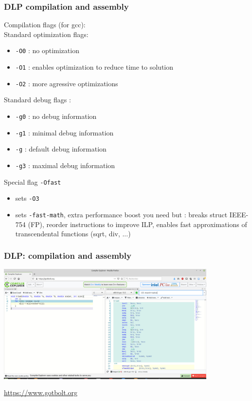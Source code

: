 \begin{frame}[containsverbatim]
\frametitle{DLP compilation and assembly}
{\footnotesize
Compilation flags (for gcc):
\\
Standard optimization flags:
\begin{itemize}
\item \texttt{-O0} : no optimization
\item \texttt{-O1} : enables optimization to reduce time to solution
\item \texttt{-O2} : more agressive optimizations
\end{itemize}
Standard debug flags :
\begin{itemize}
\item \texttt{-g0} : no debug information
\item \texttt{-g1} : minimal debug information
\item \texttt{-g} : default debug information
\item \texttt{-g3} : maximal debug information
\end{itemize}
Special flag \texttt{-Ofast}
\begin{itemize}
\item sets \texttt{-O3}
\item sets \texttt{-fast-math}, extra performance boost you need but : breaks struct IEEE-754 (FP), reorder instructions to improve ILP, enables fast approximations of transcendental functions (sqrt, div, ...)
\end{itemize}
}
\end{frame}



\begin{frame}[containsverbatim]
\frametitle{DLP: compilation and assembly}
\begin{center}
\includegraphics[width=11cm]{DayGilles/images/godbolt.jpg}
\end{center}
{\tiny \url{https://www.gotbolt.org}}
\end{frame}


